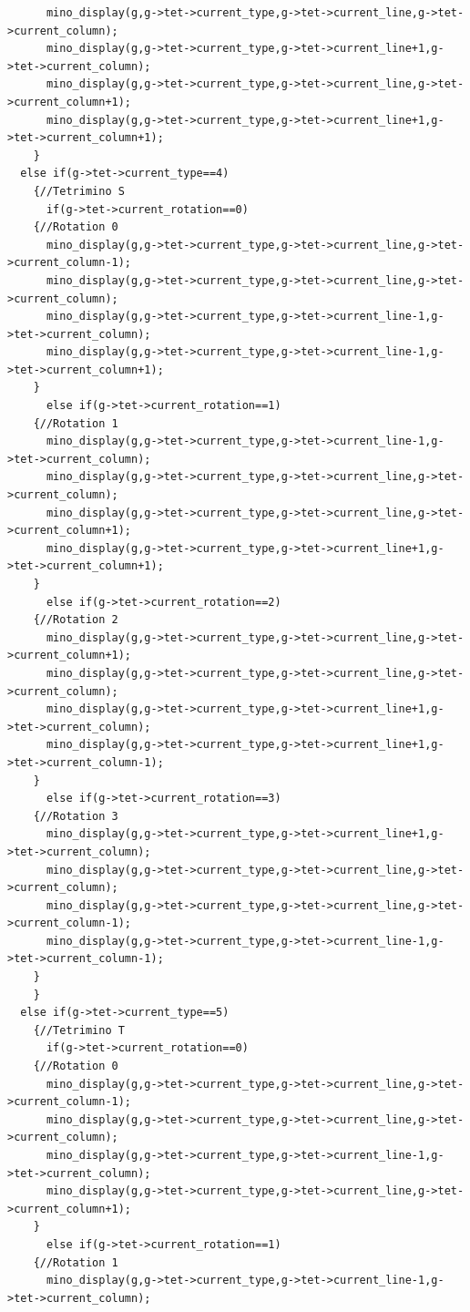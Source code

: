\documentclass[a4paper,10p]{report}
\begin{document}
\begin{lstlisting}
      mino_display(g,g->tet->current_type,g->tet->current_line,g->tet->current_column);
      mino_display(g,g->tet->current_type,g->tet->current_line+1,g->tet->current_column);
      mino_display(g,g->tet->current_type,g->tet->current_line,g->tet->current_column+1);
      mino_display(g,g->tet->current_type,g->tet->current_line+1,g->tet->current_column+1);
    }
  else if(g->tet->current_type==4)
    {//Tetrimino S
      if(g->tet->current_rotation==0)
	{//Rotation 0
	  mino_display(g,g->tet->current_type,g->tet->current_line,g->tet->current_column-1);
	  mino_display(g,g->tet->current_type,g->tet->current_line,g->tet->current_column);
	  mino_display(g,g->tet->current_type,g->tet->current_line-1,g->tet->current_column);
	  mino_display(g,g->tet->current_type,g->tet->current_line-1,g->tet->current_column+1);
	}
      else if(g->tet->current_rotation==1)
	{//Rotation 1
	  mino_display(g,g->tet->current_type,g->tet->current_line-1,g->tet->current_column);
	  mino_display(g,g->tet->current_type,g->tet->current_line,g->tet->current_column);
	  mino_display(g,g->tet->current_type,g->tet->current_line,g->tet->current_column+1);
	  mino_display(g,g->tet->current_type,g->tet->current_line+1,g->tet->current_column+1);
	}
      else if(g->tet->current_rotation==2)
	{//Rotation 2
	  mino_display(g,g->tet->current_type,g->tet->current_line,g->tet->current_column+1);
	  mino_display(g,g->tet->current_type,g->tet->current_line,g->tet->current_column);
	  mino_display(g,g->tet->current_type,g->tet->current_line+1,g->tet->current_column);
	  mino_display(g,g->tet->current_type,g->tet->current_line+1,g->tet->current_column-1);
	}
      else if(g->tet->current_rotation==3)
	{//Rotation 3
	  mino_display(g,g->tet->current_type,g->tet->current_line+1,g->tet->current_column);
	  mino_display(g,g->tet->current_type,g->tet->current_line,g->tet->current_column);
	  mino_display(g,g->tet->current_type,g->tet->current_line,g->tet->current_column-1);
	  mino_display(g,g->tet->current_type,g->tet->current_line-1,g->tet->current_column-1);
	}
    }
  else if(g->tet->current_type==5)
    {//Tetrimino T
      if(g->tet->current_rotation==0)
	{//Rotation 0
	  mino_display(g,g->tet->current_type,g->tet->current_line,g->tet->current_column-1);
	  mino_display(g,g->tet->current_type,g->tet->current_line,g->tet->current_column);
	  mino_display(g,g->tet->current_type,g->tet->current_line-1,g->tet->current_column);
	  mino_display(g,g->tet->current_type,g->tet->current_line,g->tet->current_column+1);
	}
      else if(g->tet->current_rotation==1)
	{//Rotation 1
	  mino_display(g,g->tet->current_type,g->tet->current_line-1,g->tet->current_column);

\end{lstlisting}
\end{document}

